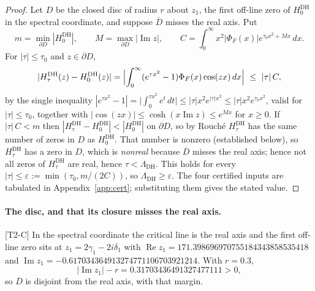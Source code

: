 \documentclass[11pt,a4paper]{article}
\theoremstyle{remark}
\newcommand{\tier}[1]{{\small\textsf{[#1]}}}
\newcommand{\LamDH}{\Lambda_{\mathrm{DH}}}
\newcommand{\PhiF}{\Phi_F}
\newcommand{\HDH}{H^{\mathrm{DH}}}
\begin{document}
\begin{proof}
Let $D$ be the closed disc of radius $r$ about $z_1$, the first off-line zero of $\HDH_0$ in
the spectral coordinate, and suppose $\overline D$ misses the real axis. Put
\[
  m=\min_{\partial D}|\HDH_0|,\qquad M=\max_{\partial D}|\operatorname{Im}z|,\qquad
  C=\int_0^\infty x^2|\PhiF(x)|e^{\tau_0x^2+Mx}\,dx .
\]
For $|\tau|\le\tau_0$ and $z\in\partial D$,
\begin{equation}\label{eq:pert}
  |\HDH_\tau(z)-\HDH_0(z)|
  =\Bigl|\int_0^\infty(e^{\tau x^2}-1)\PhiF(x)\cos(zx)\,dx\Bigr|\ \le\ |\tau|\,C ,
\end{equation}
by the single inequality
$|e^{\tau x^2}-1|=\bigl|\int_0^{\tau x^2}e^t\,dt\bigr|\le|\tau|x^2e^{|\tau|x^2}
\le|\tau|x^2e^{\tau_0x^2}$, valid for $|\tau|\le\tau_0$, together with
$|\cos(zx)|\le\cosh(x\operatorname{Im}z)\le e^{Mx}$ for $x\ge0$. If $|\tau|\,C<m$ then
$|\HDH_\tau-\HDH_0|<|\HDH_0|$ on $\partial D$, so by Rouch\'e $\HDH_\tau$ has the same
number of zeros in $D$ as $\HDH_0$. That number is nonzero (established below), so
$\HDH_\tau$ has a zero in $D$, which is \emph{nonreal} because $\overline D$ misses the real
axis; hence not all zeros of $\HDH_\tau$ are real, hence $\tau<\LamDH$. This holds for every
$|\tau|\le\varepsilon:=\min(\tau_0,m/(2C))$, so $\LamDH\ge\varepsilon$. The four certified
inputs are tabulated in Appendix~\ref{app:cert}; substituting them gives the stated value.
\end{proof}

\paragraph{The disc, and that its closure misses the real axis.} \tier{T2-C} In the spectral
coordinate the critical line is the real axis and the first off-line zero sits at
$z_1=2\gamma_1-2i\delta_1$ with
$\operatorname{Re}z_1=171.398696970755184343858535418$ and
$\operatorname{Im}z_1=-0.617034364913274771106703921214$. With $r=0.3$,
\[
  |\operatorname{Im}z_1|-r=0.31703436491327477111>0,
\]
so $\overline D$ is disjoint from the real axis, with that margin.
\end{document}
